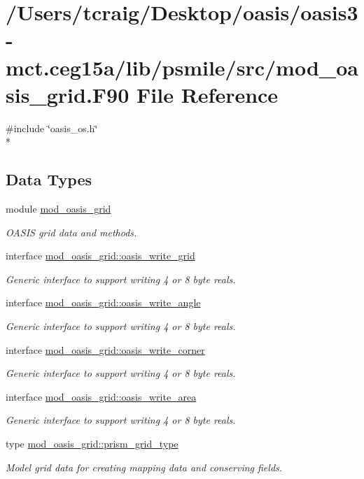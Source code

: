 \hypertarget{mod__oasis__grid_8_f90}{\section{/\+Users/tcraig/\+Desktop/oasis/oasis3-\/mct.ceg15a/lib/psmile/src/mod\+\_\+oasis\+\_\+grid.F90 File Reference}
\label{mod__oasis__grid_8_f90}
}
{\ttfamily \#include \char`\"{}oasis\+\_\+os.\+h\char`\"{}}\\*
\subsection*{Data Types}
\begin{DoxyCompactItemize}
\item 
module \hyperlink{classmod__oasis__grid}{mod\+\_\+oasis\+\_\+grid}
\begin{DoxyCompactList}\small\item\em O\+A\+S\+I\+S grid data and methods. \end{DoxyCompactList}\item 
interface \hyperlink{interfacemod__oasis__grid_1_1oasis__write__grid}{mod\+\_\+oasis\+\_\+grid\+::oasis\+\_\+write\+\_\+grid}
\begin{DoxyCompactList}\small\item\em Generic interface to support writing 4 or 8 byte reals. \end{DoxyCompactList}\item 
interface \hyperlink{interfacemod__oasis__grid_1_1oasis__write__angle}{mod\+\_\+oasis\+\_\+grid\+::oasis\+\_\+write\+\_\+angle}
\begin{DoxyCompactList}\small\item\em Generic interface to support writing 4 or 8 byte reals. \end{DoxyCompactList}\item 
interface \hyperlink{interfacemod__oasis__grid_1_1oasis__write__corner}{mod\+\_\+oasis\+\_\+grid\+::oasis\+\_\+write\+\_\+corner}
\begin{DoxyCompactList}\small\item\em Generic interface to support writing 4 or 8 byte reals. \end{DoxyCompactList}\item 
interface \hyperlink{interfacemod__oasis__grid_1_1oasis__write__area}{mod\+\_\+oasis\+\_\+grid\+::oasis\+\_\+write\+\_\+area}
\begin{DoxyCompactList}\small\item\em Generic interface to support writing 4 or 8 byte reals. \end{DoxyCompactList}\item 
type \hyperlink{structmod__oasis__grid_1_1prism__grid__type}{mod\+\_\+oasis\+\_\+grid\+::prism\+\_\+grid\+\_\+type}
\begin{DoxyCompactList}\small\item\em Model grid data for creating mapping data and conserving fields. \end{DoxyCompactList}\end{DoxyCompactItemize}

